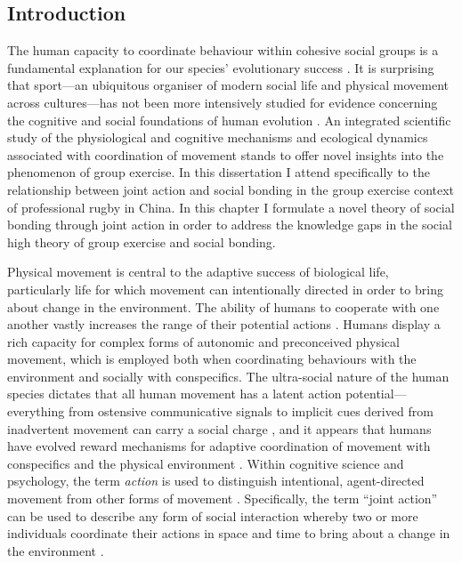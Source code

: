 \begin{CJK}{UTF8}{gbsn}
\section{Introduction}
The human capacity to coordinate behaviour within cohesive social groups is a fundamental explanation for our species' evolutionary success \citep{Tomasello2009}.  It is surprising that sport---an ubiquitous organiser of modern social life and physical movement across cultures---has not been more intensively studied for evidence concerning the cognitive and social foundations of human evolution \citep{Blanchard1995,Downey2005a}.  An integrated scientific study of the physiological and cognitive mechanisms and ecological dynamics associated with coordination of movement stands to offer novel insights into the phenomenon of group exercise.  In this dissertation I attend specifically to the relationship between joint action and social bonding in the group exercise context of professional rugby in China.  In this chapter I formulate a novel theory of social bonding through joint action in order to address the knowledge gaps in the social high theory of group exercise and social bonding.

Physical movement is central to the adaptive success of biological life, particularly life for which movement can intentionally directed in order to bring about change in the environment.  The ability of humans to cooperate with one another vastly increases the range of their potential actions \citep{Tomasello2012}.  Humans display a rich capacity for complex forms of autonomic and preconceived physical movement, which is employed both when coordinating behaviours with the environment and socially with conspecifics.  The ultra-social nature of the human species dictates that all human movement has a latent action potential---everything from ostensive communicative signals to implicit cues derived from inadvertent movement can carry a social charge \citep{Danchin2004}, and it appears that humans have evolved reward mechanisms for adaptive coordination of movement with conspecifics and the physical environment \citep{Wheatley2012,Parkinson2015,Wheatley2016}.  Within cognitive science and psychology, the term \textit{action} is used to distinguish intentional, agent-directed movement from other forms of movement \citep{Davidson1980}.
Specifically, the term ``joint action'' can be used to describe any form of social interaction whereby two or more individuals coordinate their actions in space and time to bring about a change in the environment \citep{Sebanz2006}.


\end{CJK}
